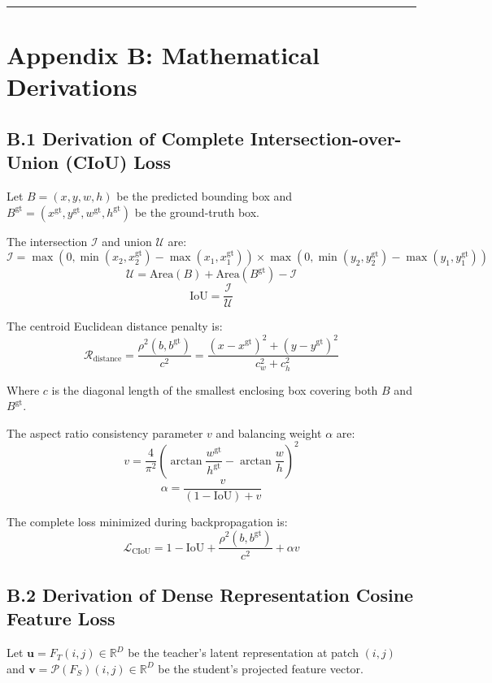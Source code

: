 \begin{center}\rule{0.5\linewidth}{0.5pt}\end{center}

\section{Appendix B: Mathematical
Derivations}\label{appendix-b-mathematical-derivations}

\subsection{B.1 Derivation of Complete Intersection-over-Union (CIoU)
Loss}\label{b.1-derivation-of-complete-intersection-over-union-ciou-loss}

Let \(B = (x, y, w, h)\) be the predicted bounding box and
\(B^{\text{gt}} = (x^{\text{gt}}, y^{\text{gt}}, w^{\text{gt}}, h^{\text{gt}})\)
be the ground-truth box.

The intersection \(\mathcal{I}\) and union \(\mathcal{U}\) are:
\[\mathcal{I} = \max(0, \min(x_2, x_2^{\text{gt}}) - \max(x_1, x_1^{\text{gt}})) \times \max(0, \min(y_2, y_2^{\text{gt}}) - \max(y_1, y_1^{\text{gt}}))\]
\[\mathcal{U} = \text{Area}(B) + \text{Area}(B^{\text{gt}}) - \mathcal{I}\]
\[\text{IoU} = \frac{\mathcal{I}}{\mathcal{U}}\]

The centroid Euclidean distance penalty is:
\[\mathcal{R}_{\text{distance}} = \frac{\rho^2(b, b^{\text{gt}})}{c^2} = \frac{(x - x^{\text{gt}})^2 + (y - y^{\text{gt}})^2}{c_w^2 + c_h^2}\]

Where \(c\) is the diagonal length of the smallest enclosing box
covering both \(B\) and \(B^{\text{gt}}\).

The aspect ratio consistency parameter \(v\) and balancing weight
\(\alpha\) are:
\[v = \frac{4}{\pi^2} \left( \arctan\frac{w^{\text{gt}}}{h^{\text{gt}}} - \arctan\frac{w}{h} \right)^2\]
\[\alpha = \frac{v}{(1 - \text{IoU}) + v}\]

The complete loss minimized during backpropagation is:
\[\mathcal{L}_{\text{CIoU}} = 1 - \text{IoU} + \frac{\rho^2(b, b^{\text{gt}})}{c^2} + \alpha v\]

\subsection{B.2 Derivation of Dense Representation Cosine Feature
Loss}\label{b.2-derivation-of-dense-representation-cosine-feature-loss}

Let \(\mathbf{u} = F_T(i, j) \in \mathbb{R}^D\) be the teacher's latent
representation at patch \((i, j)\) and
\(\mathbf{v} = \mathcal{P}(F_S)(i, j) \in \mathbb{R}^D\) be the
student's projected feature vector.

